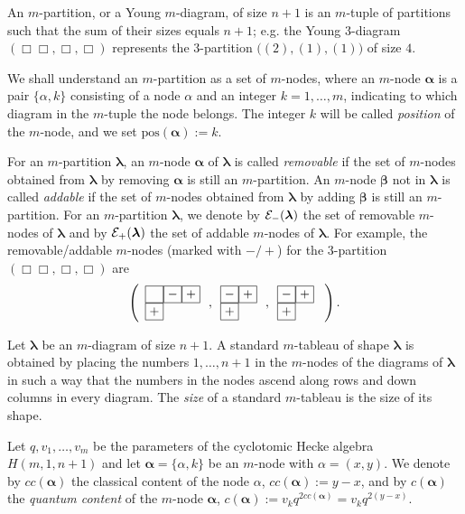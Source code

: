 \documentclass[pdftex]{sigma}
\newcommand{\pos}{{\mathrm{pos}}}
\newcommand{\cc}{cc}
\newcommand{\lam}{\boldsymbol{\lambda}}
\newcommand{\alm}{\boldsymbol{\alpha}}
\newcommand{\bem}{\boldsymbol{\beta}}
\begin{document}
An $m$-partition, or a Young $m$-diagram, of size $n+1$ is an $m$-tuple of partitions such that the sum of their sizes equals $n+1$;  e.g.
the Young $3$-diagram $\left(\Box\!\Box,\Box,\Box\right)$ represents the $3$-partition $\bigl((2),(1),(1)\bigr)$ of size $4$.


We shall understand an $m$-partition as a set of $m$-nodes, where an $m$-node $\alm$ is a pair
$\{\alpha,k\}$ consisting of a node $\alpha$ and an integer $k=1,\dots,m$, indicating to which diagram in the $m$-tuple the node belongs. The integer $k$ will be called {\it position}
of the $m$-node, and we set $\pos(\alm):=k$.



For an $m$-partition $\lam$, an $m$-node $\alm$ of $\lam$ is called {\it removable} if the set of $m$-nodes obtained from $\lam$ by removing $\alm$ is still an $m$-partition. An $m$-node $\bem$ not in $\lam$ is called {\it  addable} if the set of $m$-nodes obtained from $\lam$ by adding $\bem$ is still an $m$-partition. For an $m$-partition $\lam$, we denote by
${\cal{E}}_-(\lam)$ the set of removable $m$-nodes of $\lam$ and by ${\cal{E}}_+(\lam)$ the set of addable $m$-nodes of
$\lam$.
For example, the removable/addable $m$-nodes (marked with $-/+$) for the $3$-partition $\left(\Box\!\Box,\Box,\Box\right)$
are
\[
\left(\begin{array}{l}\fbox{$\phantom{-}$}\fbox{$-$}\fbox{$+$}\\ \fbox{$+$}\end{array}
\, ,\begin{array}{l}\fbox{$-$}\fbox{$+$}\\ \fbox{$+$}\end{array}\, ,\begin{array}{l}\fbox{$-$}\fbox{$+$}\\ \fbox{$+$}\end{array}\ \right).
\]


Let $\lam$ be an $m$-diagram of size $n+1$. A standard $m$-tableau of shape $\lam$ is obtained by placing the numbers $1,\dots,n+1$ in the $m$-nodes of the diagrams of $\lam$ in such a way that the numbers in the nodes ascend along rows and down columns in every diagram.
The \emph{size} of a standard $m$-tableau is the size of its shape.


Let $q,v_1,\dots,v_m$ be the parameters of the cyclotomic Hecke algebra $H(m,1,n+1)$ and let $\alm=\{\alpha,k\}$
be an $m$-node with $\alpha=(x,y)$.
We denote by $\cc(\alm)$ the classical content of the node $\alpha$, $\cc(\alm):=y-x$, and by $c(\alm)$ the {\it quantum content} of the $m$-node $\alm$,  $c(\alm):=v_kq^{2\cc(\alm)}=v_kq^{2(y-x)}$.
\end{document}
